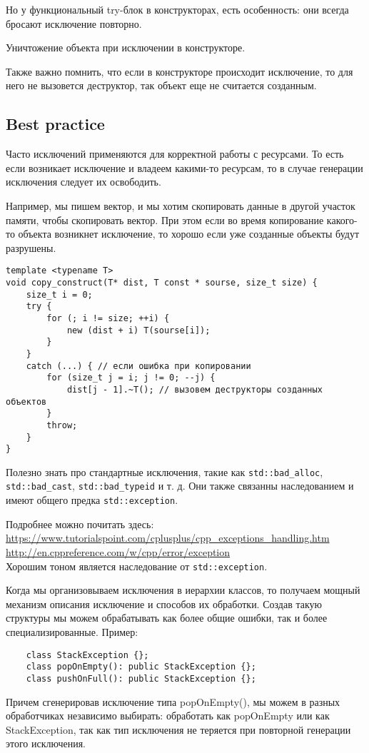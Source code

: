 Но у функциональный try-блок в конструкторах, есть особенность: они всегда бросают исключение повторно.

Уничтожение объекта при исключении в конструкторе.

Также важно помнить, что если в конструкторе происходит исключение, то для него не вызовется деструктор, так объект еще не считается созданным.

\subsection{Best practice}
Часто исключений применяются для корректной работы с ресурсами. То есть если возникает исключение и владеем какими-то ресурсам, то в случае генерации исключения следует их освободить.

Например, мы пишем вектор, и мы хотим скопировать данные в другой участок памяти, чтобы скопировать вектор. При этом если во время копирование какого-то объекта возникнет исключение, то хорошо если уже созданные объекты будут разрушены.
\begin{verbatim}
template <typename T>
void copy_construct(T* dist, T const * sourse, size_t size) {
    size_t i = 0;
    try {
        for (; i != size; ++i) {
            new (dist + i) T(sourse[i]);
        }
    }
    catch (...) { // если ошибка при копировании
        for (size_t j = i; j != 0; --j) {
            dist[j - 1].~T(); // вызовем деструкторы созданных объектов
        }
        throw;
    }
}
\end{verbatim}

Полезно знать про стандартные исключения, такие как  \texttt{std::bad_alloc}, \texttt{std::bad_cast}, \texttt{std::bad_typeid} и т. д. Они также связанны наследованием и имеют общего предка \texttt{std::exception}.

Подробнее можно почитать здесь: \\
\url{https://www.tutorialspoint.com/cplusplus/cpp_exceptions_handling.htm} \\
\url{http://en.cppreference.com/w/cpp/error/exception} \\

Хорошим тоном является наследование от \texttt{std::exception}.

Когда мы организовываем исключения в иерархии классов, то получаем мощный механизм описания исключение и способов их обработки. Создав такую структуры мы можем обрабатывать как более общие ошибки, так и более специализированные.
Пример:
\begin{verbatim}
    class StackException {};
    class popOnEmpty(): public StackException {};
    class pushOnFull(): public StackException {};
\end{verbatim}
	Причем сгенерировав исключение типа popOnEmpty(), мы можем в разных обработчиках независимо выбирать: обработать как popOnEmpty или как StackException, так как тип исключения не теряется при повторной генерации этого исключения.

